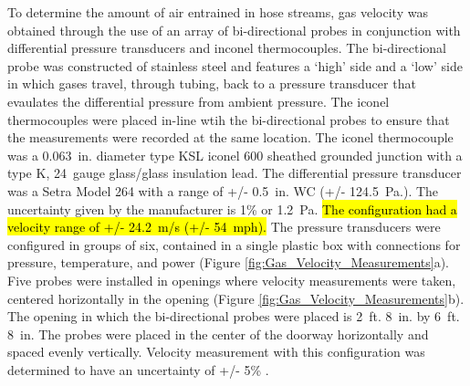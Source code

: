 \documentclass{article}
\begin{document}
To determine the amount of air entrained in hose streams, gas velocity was obtained through the use of an array of bi-directional probes in conjunction with differential pressure transducers and inconel thermocouples. The bi-directional probe was constructed of stainless steel and features a `high' side and a `low' side in which gases travel, through tubing, back to a pressure transducer that evaulates the differential pressure from ambient pressure. The iconel thermocouples were placed in-line wtih the bi-directional probes to ensure that the measurements were recorded at the same location. The iconel thermocouple was a 0.063~in. diameter type KSL iconel 600 sheathed grounded junction with a type K, 24~gauge glass/glass insulation lead. The differential pressure transducer was a Setra Model 264 with a range of +/- 0.5~in. WC (+/- 124.5~Pa.). The uncertainty given by the manufacturer is 1\% or 1.2~Pa. \hl{The configuration had a velocity range of +/- 24.2~m/s (+/- 54~mph).} The pressure transducers were configured in groups of six, contained in a single plastic box with connections for pressure, temperature, and power (Figure \ref{fig:Gas_Velocity_Measurements}a). Five probes were installed in openings where velocity measurements were taken, centered horizontally in the opening (Figure \ref{fig:Gas_Velocity_Measurements}b). The opening in which the bi-directional probes were placed is 2~ft. 8~in. by 6~ft. 8~in. The probes were placed in the center of the doorway horizontally and spaced evenly vertically. Velocity measurement with this configuration was determined to have an uncertainty of +/- 5\% \cite{BDPInPoolFires}.
\end{document}

